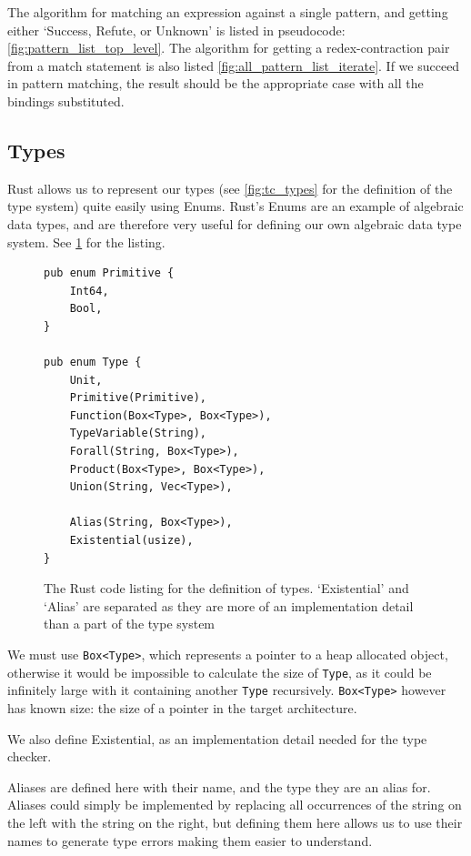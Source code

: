 The algorithm for matching an expression against a single pattern, and getting either `Success, Refute, or Unknown' is listed in pseudocode: \ref{fig:pattern_list_top_level}. The algorithm for getting a redex-contraction pair from a match statement is also listed \ref{fig:all_pattern_list_iterate}. If we succeed in pattern matching, the result should be the appropriate case with all  the bindings substituted. 


\subsection{Types}
Rust allows us to represent our types (see \ref{fig:tc_types} for the definition of the type system) quite easily using Enums. Rust's Enums are an example of algebraic data types, and are therefore very useful for defining our own algebraic data type system. See \ref{fig:type_lst} for the listing. 

\begin{figure}[ht]
    \begin{lstlisting}[language=Rust_boxed]
pub enum Primitive {
    Int64,
    Bool,
}

pub enum Type {
    Unit,
    Primitive(Primitive),
    Function(Box<Type>, Box<Type>),
    TypeVariable(String),
    Forall(String, Box<Type>),
    Product(Box<Type>, Box<Type>),
    Union(String, Vec<Type>),

    Alias(String, Box<Type>),
    Existential(usize),
}
\end{lstlisting}
    \caption{The Rust code listing for the definition of types. `Existential' and `Alias' are separated as they are more of an implementation detail than a part of the type system}
    \label{fig:type_lst}
\end{figure}

We must use \verb|Box<Type>|, which represents a pointer to a heap allocated object, otherwise it would be impossible to calculate the size of \verb|Type|, as it could be infinitely large with it containing another \verb|Type| recursively. \verb|Box<Type>| however has known size: the size of a pointer in the target architecture. 

We also define Existential, as an implementation detail needed for the type checker. 

Aliases are defined here with their name, and the type they are an alias for. Aliases could simply be implemented by replacing all occurrences of the string on the left with the string on the right, but defining them here allows us to use their names to generate type errors making them easier to understand. 

